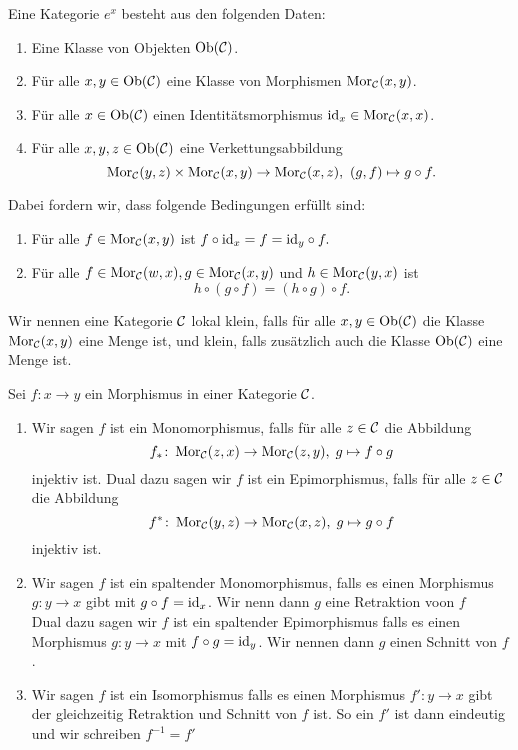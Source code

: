 \begin{Def}[Kategorie]
    Eine Kategorie \( e^x \) besteht aus den folgenden Daten:
    \begin{enumerate}
        \item Eine Klasse von Objekten \(\operatorname{Ob}(\mathcal{C})\).
        \item Für alle \(x,y\in\operatorname{Ob}(\mathcal{C})\) eine Klasse von Morphismen \(\operatorname{Mor}_{\mathcal{C}}(x,y)\).
        \item Für alle \(x\in\operatorname{Ob}(\mathcal{C})\) einen Identitätsmorphismus \(\mathrm{id}_x\in\operatorname{Mor}_{\mathcal{C}}(x,x)\).
        \item Für alle \(x,y,z\in\operatorname{Ob}(\mathcal{C})\) eine Verkettungsabbildung 
        \[\operatorname{Mor}_{\mathcal{C}}(y,z)\times \operatorname{Mor}_{\mathcal{C}}(x,y)\to \operatorname{Mor}_{\mathcal{C}}(x,z),\ (g,f)\mapsto g\circ f.\]
    \end{enumerate}
    Dabei fordern wir, dass folgende Bedingungen erfüllt sind:
    \begin{enumerate}
        \item Für alle \(f\in\operatorname{Mor}_{\mathcal{C}}(x,y)\) ist
        \(f\circ \mathrm{id}_x=f=\mathrm{id}_y\circ f.\)
        \item Für alle \(f\in\operatorname{Mor}_{\mathcal{C}}(w,x), g\in\operatorname{Mor}_{\mathcal{C}}(x,y)\) und \(h\in\operatorname{Mor}_{\mathcal{C}}(y,x)\) ist 
        \[h\circ (g\circ f)=(h\circ g)\circ f.\]
    \end{enumerate}
    Wir nennen eine Kategorie \(\mathcal{C}\) lokal klein, falls für alle \(x,y\in\operatorname{Ob}(\mathcal{C})\) die Klasse \(\operatorname{Mor}_{\mathcal{C}}(x,y)\) eine Menge ist, und klein, falls zusätzlich auch die Klasse \(\operatorname{Ob}(\mathcal{C})\) eine Menge ist.
\end{Def}
\begin{Def}
    Sei \(f\colon x\to y\) ein Morphismus in einer Kategorie \(\mathcal{C}\).
    \begin{enumerate}
        \item Wir sagen \(f\) ist ein Monomorphismus, falls für alle \(z\in\mathcal{C}\) die Abbildung 
        \[f_*\colon \operatorname{Mor}_{\mathcal{C}}(z,x)\to\operatorname{Mor}_{\mathcal{C}}(z,y),\; g\mapsto f\circ g\] injektiv ist.
        Dual dazu sagen wir \(f\) ist ein Epimorphismus, falls für alle \(z\in\mathcal{C}\) die Abbildung
        \[f^*\colon\operatorname{Mor}_{\mathcal{C}}(y,z)\to\operatorname{Mor}_{\mathcal{C}}(x,z),\; g\mapsto g\circ f\] injektiv ist.
        \item Wir sagen \(f\) ist ein spaltender Monomorphismus, falls es einen Morphismus \(g\colon y\to x\) gibt mit \(g\circ f=\mathrm{id}_x\). Wir nenn dann \(g\) eine Retraktion voon \(f\)\\
        Dual dazu sagen wir \(f\) ist ein spaltender Epimorphismus falls es einen Morphismus \(g\colon y\to x\) mit \(f\circ g=\mathrm{id}_y\). Wir nennen dann \(g\) einen Schnitt von \(f\).
        \item Wir sagen \(f\) ist ein Isomorphismus falls es einen Morphismus \(f'\colon y\to x\) gibt der gleichzeitig Retraktion und Schnitt von \(f\) ist. So ein \(f'\) ist dann eindeutig und wir schreiben \(f^{-1}=f'\)
    \end{enumerate}
\end{Def}

